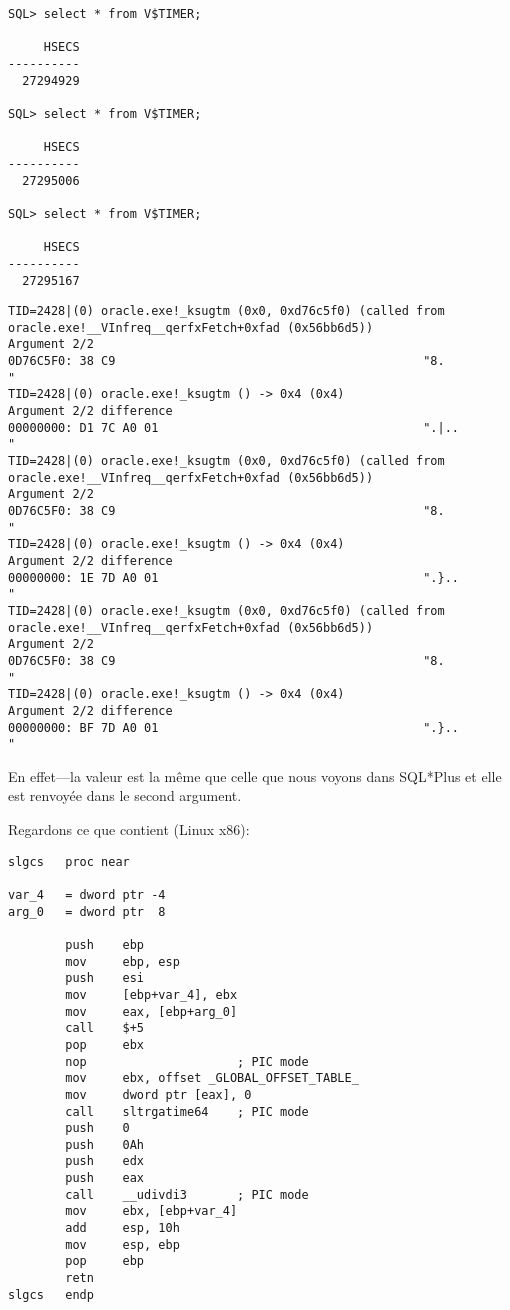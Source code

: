 \begin{lstlisting}
SQL> select * from V$TIMER;

     HSECS
----------
  27294929

SQL> select * from V$TIMER;

     HSECS
----------
  27295006

SQL> select * from V$TIMER;

     HSECS
----------
  27295167
\end{lstlisting}

\begin{lstlisting}[caption=Sortie de \tracer]
TID=2428|(0) oracle.exe!_ksugtm (0x0, 0xd76c5f0) (called from oracle.exe!__VInfreq__qerfxFetch+0xfad (0x56bb6d5))
Argument 2/2
0D76C5F0: 38 C9                                           "8.              "
TID=2428|(0) oracle.exe!_ksugtm () -> 0x4 (0x4)
Argument 2/2 difference
00000000: D1 7C A0 01                                     ".|..            "
TID=2428|(0) oracle.exe!_ksugtm (0x0, 0xd76c5f0) (called from oracle.exe!__VInfreq__qerfxFetch+0xfad (0x56bb6d5))
Argument 2/2
0D76C5F0: 38 C9                                           "8.              "
TID=2428|(0) oracle.exe!_ksugtm () -> 0x4 (0x4)
Argument 2/2 difference
00000000: 1E 7D A0 01                                     ".}..            "
TID=2428|(0) oracle.exe!_ksugtm (0x0, 0xd76c5f0) (called from oracle.exe!__VInfreq__qerfxFetch+0xfad (0x56bb6d5))
Argument 2/2
0D76C5F0: 38 C9                                           "8.              "
TID=2428|(0) oracle.exe!_ksugtm () -> 0x4 (0x4)
Argument 2/2 difference
00000000: BF 7D A0 01                                     ".}..            "
\end{lstlisting}

En effet---la valeur est la même que celle que nous voyons dans SQL*Plus et elle
est renvoyée dans le second argument.

Regardons ce que  contient (Linux x86):

\begin{lstlisting}[style=customasmx86]
slgcs   proc near

var_4   = dword ptr -4
arg_0   = dword ptr  8

        push    ebp
        mov     ebp, esp
        push    esi
        mov     [ebp+var_4], ebx
        mov     eax, [ebp+arg_0]
        call    $+5
        pop     ebx
        nop                     ; PIC mode
        mov     ebx, offset _GLOBAL_OFFSET_TABLE_
        mov     dword ptr [eax], 0
        call    sltrgatime64    ; PIC mode
        push    0
        push    0Ah
        push    edx
        push    eax
        call    __udivdi3       ; PIC mode
        mov     ebx, [ebp+var_4]
        add     esp, 10h
        mov     esp, ebp
        pop     ebp
        retn
slgcs   endp
\end{lstlisting}

